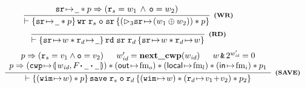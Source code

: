 \begin{figure*}[!thp]
{\begin{minipage}{1\linewidth}
			\[
				\infer[\tinybftext{(WR)}]
				{
					\wfins{\regst{\sr}{\notCare} * p}{\cwr \; \reg{s} \; \oexp \; \sr}
					{(\dlyregst{3}{\sr}{(\word_1 \xorOP \word_2)} ) * p}
				}
				{
					\regst{\sr}{\notCare} * p \Rightarrow (\reg{s} = \word_1 \, \wedge \, \oexp = \word_2)
				}
			\]
            \[
                \infer[\tinybftext{(RD)}]
                {
                    \wfins{\regst{\sr}{\word} * \regst{\reg{d}}{\notCare}}{\rd \; \sr \; \reg{d}}
                    {\regst{\sr}{\word} * \regst{\reg{d}}{\word}}
                }
                {}
            \]
%
%
			\[\begin{array}{l}
				\infer[\tinybftext{(SAVE)}]
				{
					\wfins{(\regst{\regwim}{\word}) * p}
					{\csave \; \reg{s} \; \oexp \; \reg{d}}
					{(\regst{\regwim}{\word}) * (\regst{\reg{d}}{\val_1 \!+\! \val_2}) * p_2}
				}
				{
					\begin{array}{c}
						p \Rightarrow (\reg{s} = \val_1 \wedge \oexp = \val_2) \quad \; \;
						\cwp' = \precwp(\cwp) \quad \; \;
						\word \,\bitAND\, 2^{\cwp'} = 0 \\
						p \Rightarrow
						\left(\frmst{\cwp}{\Wstack \lstApp \, \notCare \, \lstApp \, \notCare}\right) *
						(\OutRegs{\fm_o}) *
                        (\LocalRegs{\fm_l}) *
                        (\InRegs{\fm_i})
                        * p_1 \\

\end{array}}
\end{array}\]
\end{minipage}}
\end{figure*}

